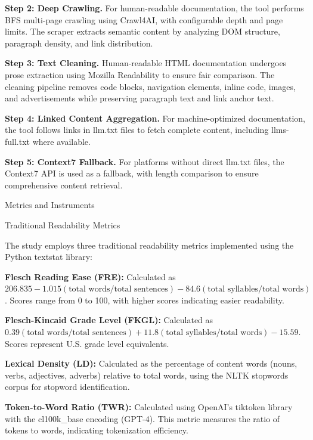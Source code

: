 \documentclass[10pt,conference,a4paper]{IEEEtran}
\makeatletter
\let\oldsubsection\subsection
\let\oldsubsubsection\subsubsection
\renewcommand{\subsection}{%
    \@ifstar{\subsectionStar}{\subsectionNoStar}%
}
\newcommand{\subsectionStar}[1]{%
    \oldsubsection*{\textit{#1}}%
    \vspace{-3pt}%
}
\newcommand{\subsectionNoStar}[1]{%
    \oldsubsection{\textit{#1}}%
    \vspace{-3pt}%
}
\renewcommand{\subsubsection}{%
    \@ifstar{\subsubsectionStar}{\subsubsectionNoStar}%
}
\newcommand{\subsubsectionStar}[1]{%
    \oldsubsubsection*{\textit{#1}}%
}
\newcommand{\subsubsectionNoStar}[1]{%
    \oldsubsubsection{\textit{#1}}%
}
\makeatother
\begin{document}
\textbf{Step 2: Deep Crawling.} For human-readable documentation, the tool performs BFS multi-page crawling using Crawl4AI, with configurable depth and page limits. The scraper extracts semantic content by analyzing DOM structure, paragraph density, and link distribution.

\textbf{Step 3: Text Cleaning.} Human-readable HTML documentation undergoes prose extraction using Mozilla Readability \cite{MozillaReadability} to ensure fair comparison. The cleaning pipeline removes code blocks, navigation elements, inline code, images, and advertisements while preserving paragraph text and link anchor text.

\textbf{Step 4: Linked Content Aggregation.} For machine-optimized documentation, the tool follows links in llm.txt files to fetch complete content, including llms-full.txt where available.

\textbf{Step 5: Context7 Fallback.} For platforms without direct llm.txt files, the Context7 API is used as a fallback, with length comparison to ensure comprehensive content retrieval.

\subsection{Metrics and Instruments}

\subsubsection{Traditional Readability Metrics}

The study employs three traditional readability metrics implemented using the Python textstat library:

\textbf{Flesch Reading Ease (FRE):} Calculated as $206.835 - 1.015(\text{total words} / \text{total sentences}) - 84.6(\text{total syllables} / \text{total words})$. Scores range from 0 to 100, with higher scores indicating easier readability.

\textbf{Flesch-Kincaid Grade Level (FKGL):} Calculated as $0.39(\text{total words} / \text{total sentences}) + 11.8(\text{total syllables} / \text{total words}) - 15.59$. Scores represent U.S. grade level equivalents.

\textbf{Lexical Density (LD):} Calculated as the percentage of content words (nouns, verbs, adjectives, adverbs) relative to total words, using the NLTK stopwords corpus for stopword identification.

\textbf{Token-to-Word Ratio (TWR):} Calculated using OpenAI's tiktoken library with the cl100k\_base encoding (GPT-4). This metric measures the ratio of tokens to words, indicating tokenization efficiency.
\end{document}

